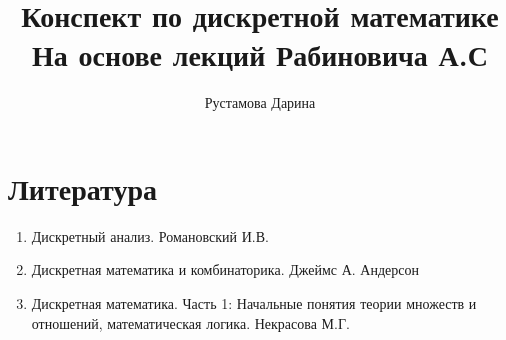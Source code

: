 \documentclass[12pt]{report}
\title{
    Конспект по дискретной математике \\ 
    \large На основе лекций Рабиновича А.С}
\author{
    Рустамова Дарина
}
\date{\the\year}
\begin{document}
\maketitle
\tableofcontents

\newcommand\shortlorem{}

\newpage













\chapter*{Литература}
\begin{enumerate}
    \item Дискретный анализ. Романовский И.В.
    \item Дискретная математика и комбинаторика. Джеймс А. Андерсон
    \item Дискретная математика. Часть 1: Начальные понятия теории множеств и отношений,
    математическая логика. Некрасова М.Г.
\end{enumerate}

\shortlorem
\end{document}
